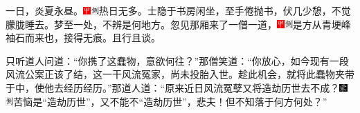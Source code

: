 一日，炎夏永昼。{\includegraphics[width=3mm]{../Images/00002}\includegraphics[width=3mm]{../Images/00011}\footnotesize \kaishu 热日无多。}士隐于书房闲坐，至手倦抛书，伏几少憩，不觉朦胧睡去。梦至一处，不辨是何地方。忽见那厢来了一僧一道，{\includegraphics[width=3mm]{../Images/00002}\includegraphics[width=3mm]{../Images/00011}\footnotesize \kaishu 是方从青埂峰袖石而来也，接得无痕。}且行且谈。

只听道人问道：``你携了这蠢物，意欲何往？''那僧笑道：``你放心，如今现有一段风流公案正该了结，这一干风流冤家，尚未投胎入世。趁此机会，就将此蠢物夹带于中，使他去经历经历。''那道人道：``原来近日风流冤孽又将造劫历世去不成？{\includegraphics[width=3mm]{../Images/00006}\includegraphics[width=3mm]{../Images/00011}\footnotesize \kaishu 苦恼是``造劫历世''，又不能不``造劫历世''，悲夫！}但不知落于何方何处？''

